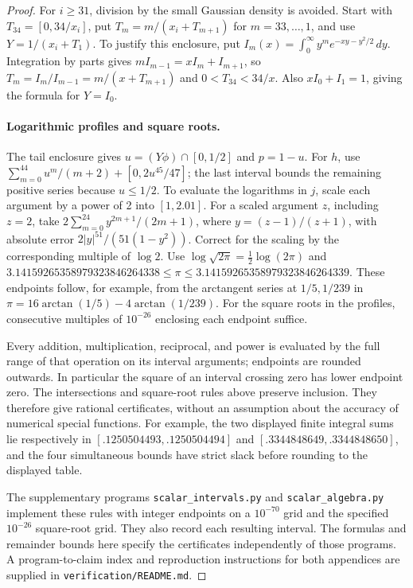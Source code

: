 \begin{proof}
For \(i\ge31\), division by the small Gaussian density is avoided.
Start with \(T_{34}=[0,34/x_i]\), put
\(T_m=m/(x_i+T_{m+1})\) for \(m=33,\ldots,1\), and use
\(Y=1/(x_i+T_1)\). To justify this enclosure, put
\(I_m(x)=\int_0^\infty y^m e^{-xy-y^2/2}\,dy\).
Integration by parts gives \(mI_{m-1}=xI_m+I_{m+1}\), so
\(T_m=I_m/I_{m-1}=m/(x+T_{m+1})\) and \(0<T_{34}<34/x\).
Also \(xI_0+I_1=1\), giving the formula for \(Y=I_0\).

\paragraph{Logarithmic profiles and square roots.}
The tail enclosure gives \(u=(Y\phi)\cap[0,1/2]\) and \(p=1-u\).
For \(h\), use
\(\sum_{m=0}^{44}u^m/(m+2)+[0,2u^{45}/47]\); the last interval
bounds the remaining positive series because \(u\le1/2\).
To evaluate the logarithms in \(j\), scale each argument by a power
of 2 into \([1,2.01]\). For a scaled argument \(z\), including
\(z=2\), take
\(2\sum_{m=0}^{24}y^{2m+1}/(2m+1)\), where \(y=(z-1)/(z+1)\),
with absolute error \(2|y|^{51}/(51(1-y^2))\). Correct for the
scaling by the corresponding multiple of \(\log2\).
Use \(\log\sqrt{2\pi}=\frac12\log(2\pi)\) and
\(3.14159265358979323846264338\le\pi\le3.14159265358979323846264339\).
These endpoints follow, for example, from the arctangent series at
\(1/5,1/239\) in \(\pi=16\arctan(1/5)-4\arctan(1/239)\).
For the square roots in the profiles, consecutive multiples of
\(10^{-26}\) enclosing each endpoint suffice.


Every addition, multiplication, reciprocal, and power is evaluated by
the full range of that operation on its interval arguments; endpoints
are rounded outwards. In particular the square of an interval crossing
zero has lower endpoint zero. The intersections and square-root rules
above preserve inclusion. They therefore give rational certificates,
without an assumption about the accuracy of numerical special functions.
For example, the two displayed finite integral sums lie respectively in
\([.1250504493,.1250504494]\) and
\([.3344848649,.3344848650]\), and the four simultaneous bounds have
strict slack before rounding to the displayed table.

The supplementary programs \texttt{scalar\_intervals.py} and
\texttt{scalar\_algebra.py} implement these rules with integer endpoints
on a \(10^{-70}\) grid and the specified \(10^{-26}\) square-root grid.
They also record each resulting interval. The formulas and remainder
bounds here specify the certificates independently of those programs.
A program-to-claim index and reproduction instructions for both
appendices are supplied in \texttt{verification/README.md}.
\end{proof}

